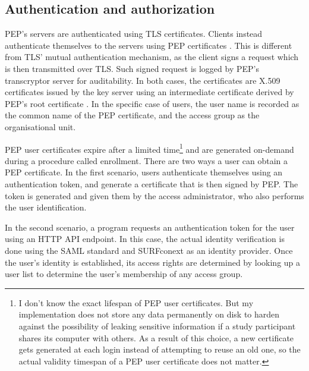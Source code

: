 \documentclass{report}
\begin{document}
\subsection{Authentication and authorization}\label{authentication_and:authorization}
PEP's servers are authenticated using TLS certificates. Clients instead authenticate themselves to the servers using PEP certificates \cite{pep-blueprint}. This is different from
TLS' mutual authentication mechanism, as the client signs a request which is then transmitted over TLS. Such signed request is logged by PEP's transcryptor server for auditability. In
both cases, the certificates are X.509 certificates \cite{X.509} issued by the key server using an intermediate certificate derived by PEP's root certificate \cite{pep-blueprint}.
In the specific case of users, the user name is recorded as the common name of the PEP certificate, and the access group as the organisational unit.\par
PEP user certificates expire after a limited time\footnote{I don't know the exact lifespan of PEP user certificates. But my implementation does not store any data permanently on
disk to harden against the possibility of leaking sensitive information if a study participant shares its computer with others. As a result of this choice, a new certificate gets
generated at each login instead of attempting to reuse an old one, so the actual validity timespan of a PEP user certificate does not matter.} and are generated on-demand during a procedure called enrollment. 
There are two ways a user can obtain a PEP certificate. In the first scenario, users authenticate themselves using an authentication token, and generate a certificate that is then
signed by PEP. The token is generated and given them by the access administrator, who also performs the user identification. \par
In the second scenario, a program requests an authentication token for the user using an HTTP API endpoint. In this case, the actual identity verification is done using the SAML 
standard \cite{sstc-saml-core-errata-2.0-wd-07} and SURFconext \cite{surfconext} as an identity provider. Once the user's identity is established, its access rights are determined by 
looking up a user list to determine the user's membership of any access group. 
\end{document}

